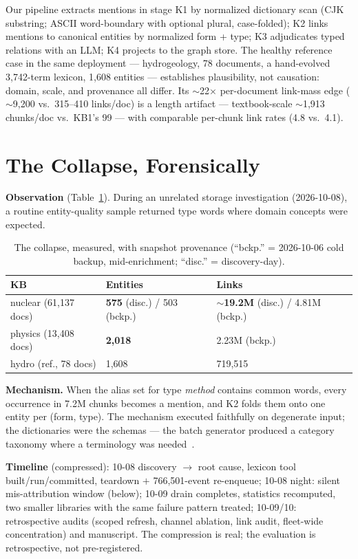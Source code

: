 \documentclass[sigconf,nonacm,anonymous]{acmart}
\begin{document}
Our pipeline extracts mentions in stage K1 by normalized dictionary scan
(CJK substring; ASCII word-boundary with optional plural, case-folded);
K2 links mentions to canonical entities by normalized form + type; K3
adjudicates typed relations with an LLM; K4 projects to the graph store.
The healthy reference case in the same deployment --- hydrogeology, 78
documents, a hand-evolved 3{,}742-term lexicon, 1{,}608 entities ---
establishes plausibility, not causation: domain, scale, and provenance
all differ. Its ${\sim}$22$\times$ per-document link-mass edge
(${\sim}$9{,}200 vs.\ 315--410 links/doc) is a length artifact ---
textbook-scale ${\sim}$1{,}913 chunks/doc vs.\ KB1's 99 --- with
comparable per-chunk link rates (4.8 vs.\ 4.1).

\section{The Collapse, Forensically}\label{sec:collapse}

\textbf{Observation} (Table~\ref{tab:collapse}). During an unrelated
storage investigation (2026-10-08), a routine entity-quality sample
returned type words where domain concepts were expected.

\begin{table}[t]
\centering
\caption{The collapse, measured, with snapshot provenance (``bckp.'' =
2026-10-06 cold backup, mid-enrichment; ``disc.'' = discovery-day).}
\label{tab:collapse}
\small
\begin{tabularx}{\columnwidth}{@{}lXX@{}}
\toprule
KB & Entities & Links \\
\midrule
nuclear (61{,}137 docs) & \textbf{575} (disc.) / 503 (bckp.) & \textbf{${\sim}$19.2M} (disc.) / 4.81M (bckp.) \\
physics (13{,}408 docs) & \textbf{2{,}018} & 2.23M (bckp.) \\
hydro (ref., 78 docs) & 1{,}608 & 719{,}515 \\
\bottomrule
\end{tabularx}
\end{table}

\textbf{Mechanism.} When the alias set for type \emph{method} contains
common words, every occurrence in 7.2M chunks becomes a mention, and K2
folds them onto one entity per (form, type). The mechanism executed
faithfully on degenerate input; the dictionaries were the schemas ---
the batch generator produced a category taxonomy where a terminology was
needed~\cite{iso1087}.

\textbf{Timeline} (compressed): 10-08 discovery $\to$ root cause,
lexicon tool built/run/committed, teardown $+$ 766{,}501-event
re-enqueue; 10-08 night: silent mis-attribution window (below); 10-09
drain completes, statistics recomputed, two smaller libraries with the
same failure pattern treated; 10-09/10: retrospective audits (scoped
refresh, channel ablation, link audit, fleet-wide concentration) and
manuscript. The compression is real; the evaluation is retrospective,
not pre-registered.
\end{document}
